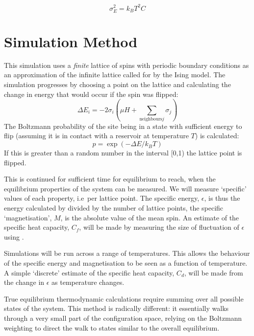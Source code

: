 \documentclass[12pt,a4paper,english]{article}
\begin{document}
\begin{equation}
\label{eq:e-fluc}
\sigma_E^2=k_B T^2 C
\end{equation}

\section{Simulation Method}
\label{sec:method}

This simulation uses a \emph{finite} lattice of spins with periodic boundary conditions as an approximation of the infinite lattice called for by the Ising model.  The simulation progresses by choosing a point on the lattice and calculating the change in energy that would occur if the spin was flipped:
\begin{equation}
\Delta E_i = - 2 \sigma_i \left( \mu H + \sum_{\mathrm{neighbours }j} \sigma_j \right)
\end{equation}
The Boltzmann probability of the site being in a state with sufficient energy to flip (assuming it is in contact with a reservoir at temperature $T$) is calculated:
\begin{equation}
p = \exp\left(-\Delta E / k_B T \right)
\end{equation}
If this is greater than a random number in the interval [0,1) the lattice point is flipped.

This is continued for sufficient time for equilibrium to reach, when the equilibrium properties of the system can be measured.  We will measure `specific' values of each property, i.e\ per lattice point.  The specific energy, $\epsilon$, is thus the energy calculated by  divided by the number of lattice points, the specific `magnetisation', $M$, is the absolute value of the mean spin. An estimate of the specific heat capacity, $C_f$, will be made by measuring the size of fluctuation of $\epsilon$ using .

Simulations will be run across a range of temperatures.  This allows the behaviour of the specific energy and magnetisation to be seen as a function of temperature.  A simple `discrete' estimate of the specific heat capacity, $C_d$, will be made from the change in $\epsilon$ as temperature changes.

True equilibrium thermodynamic calculations require summing over all possible states of the system. This method is radically different: it essentially walks through a very small part of the configuration space, relying on the Boltzmann weighting to direct the walk to states similar to the overall equilibrium.
\end{document}
